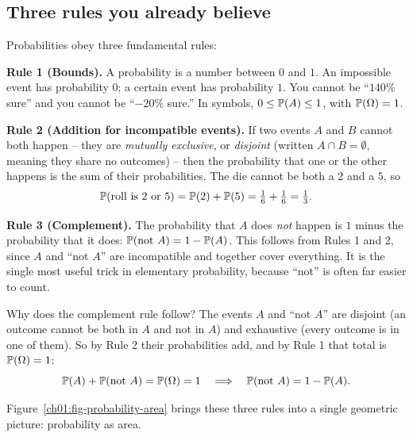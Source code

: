\subsection{Three rules you already believe}
\label{ch01:three-rules}

Probabilities obey three fundamental rules:

\textbf{Rule 1 (Bounds).} A probability is a number between $0$ and $1$. An
impossible event has probability $0$; a certain event has probability $1$. You
cannot be ``$140\%$ sure'' and you cannot be ``$-20\%$ sure.'' In symbols,
$0 \le \P(A) \le 1$, with $\P(\Omega) = 1$.

\textbf{Rule 2 (Addition for incompatible events).} If two events $A$ and $B$
cannot both happen -- they are \emph{mutually exclusive}, or \emph{disjoint}
(written $A \cap B = \emptyset$, meaning they share no outcomes) -- then the
probability that one or the other happens is the sum of their probabilities. The
die cannot be both a $2$ and a $5$, so
\[
  \P(\text{roll is } 2 \text{ or } 5) = \P(2) + \P(5) = \tfrac16 + \tfrac16 = \tfrac13.
\]

\textbf{Rule 3 (Complement).} The probability that $A$ does \emph{not} happen is
$1$ minus the probability that it does: $\P(\text{not } A) = 1 - \P(A)$. This
follows from Rules 1 and 2, since $A$ and ``not $A$'' are incompatible and together
cover everything. It is the single most useful trick in elementary probability,
because ``not'' is often far easier to count.

\begin{whybox}
Why does the complement rule follow? The events $A$ and ``not $A$'' are disjoint
(an outcome cannot be both in $A$ and not in $A$) and exhaustive (every outcome is
in one of them). So by Rule 2 their probabilities add, and by Rule 1 that total is
$\P(\Omega) = 1$:
\[
  \P(A) + \P(\text{not } A) = \P(\Omega) = 1
  \quad\Longrightarrow\quad
  \P(\text{not } A) = 1 - \P(A).
\]

\end{whybox}

Figure~\ref{ch01:fig-probability-area} brings these three rules into a single
geometric picture: probability as area.

